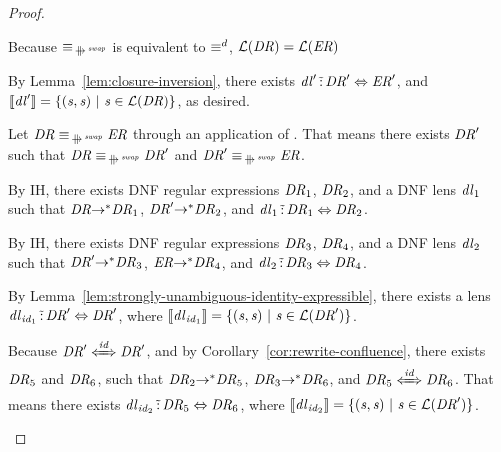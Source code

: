 \documentclass[numbers,10pt,preprint\ifanon ,nocopyrightspace\fi]{sigplanconf}
\begin{document}
\begin{proof}
\begin{case}[\SymmetryRule]
    Because $\EquivalenceOf{\ParallelRewriteSwap}$ is equivalent to
    $\equiv^d$, $\mathcal{L}(\mathit{DR}) = \mathcal{L}(\mathit{ER})$

    By Lemma~\ref{lem:closure-inversion}, there exists
    $\mathit{dl}' \,\tilde{:}\, \mathit{DR}' \Leftrightarrow \mathit{ER}'$,
    and $[ \! [\mathit{dl}'] \! ] = \{(\mathit{s},\mathit{s}) ~|~
      \mathit{s} \in \mathcal{L}(\mathit{DR})\}$, as desired.
  \end{case}

  \begin{case}[\TransitivityRule{}]
    Let $\DNFRegex \EquivalenceOf{\ParallelRewriteSwap} \DNFRegexAlt$ through an
    application of \TransitivityRule{}.
    That means there exists $\mathit{DR}'$ such that
    $\DNFRegex \EquivalenceOf{\ParallelRewriteSwap} \DNFRegex'$ and
    $\DNFRegex' \EquivalenceOf{\ParallelRewriteSwap} \DNFRegexAlt$.

    By IH, there exists DNF regular expressions $\mathit{DR}_1$, $\mathit{DR}_2$,
    and a DNF lens $\mathit{dl}_1$ such that
    $\mathit{DR} {\rightarrow}^* \mathit{DR}_1$,
    $\mathit{DR}' {\rightarrow}^* \mathit{DR}_2$,
    and $\mathit{dl}_1 \,\tilde{:}\, \mathit{DR}_1 \Leftrightarrow \mathit{DR}_2$.

    By IH, there exists DNF regular expressions $\mathit{DR}_3$, $\mathit{DR}_4$,
    and a DNF lens $\mathit{dl}_2$ such that
    $\mathit{DR}' {\rightarrow}^* \mathit{DR}_3$,
    $\mathit{ER} {\rightarrow}^* \mathit{DR}_4$,
    and $\mathit{dl}_2 \,\tilde{:}\, \mathit{DR}_3 \Leftrightarrow \mathit{DR}_4$.

    By Lemma~\ref{lem:strongly-unambiguous-identity-expressible}, there exists a
    lens $\mathit{dl}_{\mathit{id}_1} \,\tilde{:}\,
    \mathit{DR}' \Leftrightarrow \mathit{DR}'$, where
    $[ \! [\mathit{dl}_{\mathit{id}_1}] \! ] = \{(\mathit{s},\mathit{s}) ~|~
      \mathit{s} \in \mathcal{L}(\mathit{DR}')\}$.
    
    Because $\SatisfiesIdentitySemantics{\DNFRegex'}{\DNFRegex'}$, and
    by Corollary~\ref{cor:rewrite-confluence}, there exists $\mathit{DR}_5$ and
    $\mathit{DR}_6$, such that
    $\mathit{DR}_2 {\rightarrow}^* \mathit{DR}_5$,
    $\mathit{DR}_3 {\rightarrow}^* \mathit{DR}_6$, and
    $\SatisfiesIdentitySemantics{\DNFRegex_5}{\DNFRegex_6}$.
    That means there exists
    $\mathit{dl}_{\mathit{id}_2} \,\tilde{:}\,
    \mathit{DR}_5 \Leftrightarrow \mathit{DR}_6$, where
    $[ \! [\mathit{dl}_{\mathit{id}_2}] \! ] = \{(\mathit{s},\mathit{s}) ~|~
      \mathit{s} \in \mathcal{L}(\mathit{DR}')\}$.


\end{case}
\end{proof}
\end{document}

